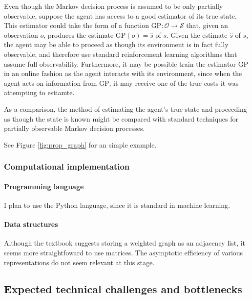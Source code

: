 Even though the Markov decision process is assumed to be only partially observable, suppose the agent has access to a good estimator of its true state. This estimator could take the form of a function $\text{GP} \colon \mathcal O \to \mathcal S$ that, given an observation $o$, produces the estimate $\text{GP}(o) = \hat s$ of $s$. Given the estimate $\hat s$ of $s$, the agent may be able to proceed as though its environment is in fact fully observable, and therefore use standard reinforcement learning algorithms that assume full observability. Furthermore, it may be possible train the estimator $\text{GP}$ in an online fashion as the agent interacts with its environment, since when the agent acts on information from $\text{GP}$, it may receive one of the true costs it was attempting to estiamte.

As a comparison, the method of estimating the agent's true state and proceeding as though the state is known might be compared with standard techniques for partially observable Markov decision processes.

See Figure \ref{fig:prop_graph} for an simple example.

\subsubsection{Computational implementation}

\paragraph{Programming language} I plan to use the Python language, since it is standard in machine learning.

\paragraph{Data structures} Although the textbook \cite[Ch. 20]{clrs} suggests storing a weighted graph as an adjacency list, it seems more straightfoward to use matrices. The asymptotic efficiency of various representations do not seem relevant at this stage.


\subsection{Expected technical challenges and bottlenecks}

